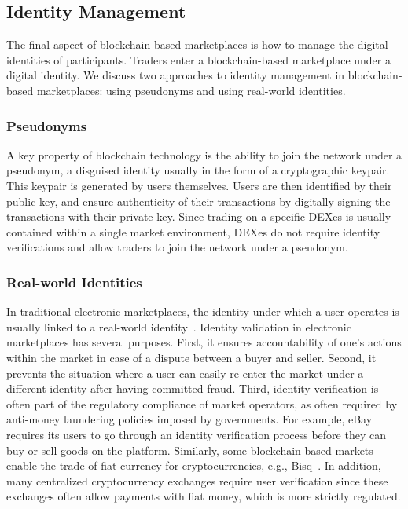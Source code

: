 \subsection{Identity Management}
The final aspect of blockchain-based marketplaces is how to manage the digital identities of participants.
Traders enter a blockchain-based marketplace under a digital identity.
We discuss two approaches to identity management in blockchain-based marketplaces: using pseudonyms and using real-world identities.

\subsubsection{Pseudonyms}
A key property of blockchain technology is the ability to join the network under a pseudonym, a disguised identity usually in the form of a cryptographic keypair.
This keypair is generated by users themselves.
Users are then identified by their public key, and ensure authenticity of their transactions by digitally signing the transactions with their private key.
Since trading on a specific DEXes is usually contained within a single market environment, DEXes do not require identity verifications and allow traders to join the network under a pseudonym.

\subsubsection{Real-world Identities}
In traditional electronic marketplaces, the identity under which a user operates is usually linked to a real-world identity~\cite{subramanian2017decentralized}.
Identity validation in electronic marketplaces has several purposes.
First, it ensures accountability of one's actions within the market in case of a dispute between a buyer and seller.
Second, it prevents the situation where a user can easily re-enter the market under a different identity after having committed fraud.
Third, identity verification is often part of the regulatory compliance of market operators, as often required by anti-money laundering policies imposed by governments.
For example, eBay requires its users to go through an identity verification process before they can buy or sell goods on the platform.
Similarly, some blockchain-based markets enable the trade of fiat currency for cryptocurrencies, e.g., Bisq~\cite{bisq}.
In addition, many centralized cryptocurrency exchanges require user verification since these exchanges often allow payments with fiat money, which is more strictly regulated.


